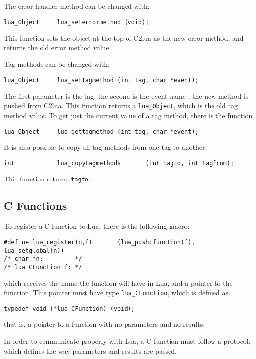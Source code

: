 The error handler method  can be changed with:
\begin{verbatim}
lua_Object     lua_seterrormethod (void);
\end{verbatim}
This function sets the object at the top of C2lua
as the new error method,
and returns the old error method value.

Tag methods can be changed with:
\begin{verbatim}
lua_Object     lua_settagmethod (int tag, char *event);
\end{verbatim}
The first parameter is the tag,
the second is the event name ;
the new method is pushed from C2lua.
This function returns a \verb|lua_Object|,
which is the old tag method value.
To get just the current value of a tag method,
there is the function
\begin{verbatim}
lua_Object     lua_gettagmethod (int tag, char *event);
\end{verbatim}

It is also possible to copy all tag methods from one tag to another:
\begin{verbatim}
int            lua_copytagmethods       (int tagto, int tagfrom);
\end{verbatim}
This function returns \verb|tagto|.


\subsection{C Functions} \label{LuacallC}
To register a C function to Lua,
there is the following macro:
\begin{verbatim}
#define lua_register(n,f)       (lua_pushcfunction(f), lua_setglobal(n))
/* char *n;         */
/* lua_CFunction f; */
\end{verbatim}
which receives the name the function will have in Lua,
and a pointer to the function.
This pointer must have type \verb|lua_CFunction|,
which is defined as
\begin{verbatim}
typedef void (*lua_CFunction) (void);
\end{verbatim}
that is, a pointer to a function with no parameters and no results.

In order to communicate properly with Lua,
a C function must follow a protocol,
which defines the way parameters and results are passed.

